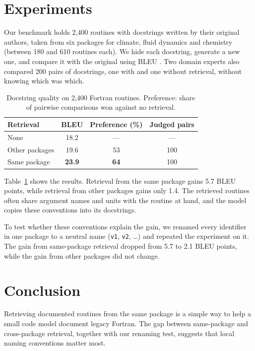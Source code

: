 \documentclass{article}
\begin{document}
\section{Experiments}
\label{sec:experiments}

Our benchmark holds 2,400 routines with docstrings written by their original authors, taken from six packages for climate, fluid dynamics and chemistry (between 180 and 610 routines each). %
We hide each docstring, generate a new one, and compare it with the original using BLEU \citep{papineni2002bleu}.
Two domain experts also compared 200 pairs of docstrings, one with and one without retrieval, without knowing which was which.

\begin{table}[t]
\caption{Docstring quality on 2,400 Fortran routines. Preference: share of pairwise comparisons won against no retrieval.}
\label{tab:results}
\centering
\begin{tabular}{lccc}
\toprule
Retrieval & BLEU & Preference (\%) & Judged pairs \\
\midrule
None & 18.2 & --- & --- \\
Other packages & 19.6 & 53 & 100 \\
Same package & \textbf{23.9} & \textbf{64} & 100 \\
\bottomrule
\end{tabular}
\end{table}

Table~\ref{tab:results} shows the results.
Retrieval from the same package gains 5.7 BLEU points, while retrieval from other packages gains only 1.4.
The retrieved routines often share argument names and units with the routine at hand, and the model copies these conventions into its docstrings.

To test whether these conventions explain the gain, we renamed every identifier in one package to a neutral name (\texttt{v1}, \texttt{v2}, \ldots) and repeated the experiment on it.
The gain from same-package retrieval dropped from 5.7 to 2.1 BLEU points, while the gain from other packages did not change.

\section{Conclusion}
\label{sec:conclusion}

Retrieving documented routines from the same package is a simple way to help a small code model document legacy Fortran.
The gap between same-package and cross-package retrieval, together with our renaming test, suggests that local naming conventions matter most.



\end{document}
